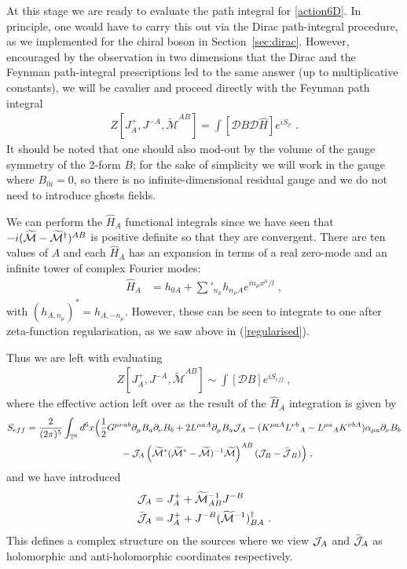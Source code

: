 \documentclass[11pt]{article}
\numberwithin{equation}{section}
\begin{document}
At this stage we are ready to evaluate the path integral for \eqref{action6D}. In principle, one would have to carry this out via the Dirac path-integral procedure, as we implemented for the chiral boson in Section~\ref{sec:dirac}. However, encouraged by the observation in two dimensions that the Dirac and the Feynman path-integral prescriptions led to the same answer (up to multiplicative constants), we will be cavalier and proceed directly with the Feynman path integral
\begin{align}
    Z[J^+_{A},J^{-A}, \widetilde {\mathcal M}^{AB}] = \int[\mathcal DB \mathcal D \hat H ]e^{i S_{\mathcal C}}\;.
\end{align}
It should be noted that one should also mod-out by the volume of the gauge symmetry of the  2-form $B$; for the sake of simplicity we will work in the gauge where $B_{0i}=0$, so there is no infinite-dimensional residual gauge and we do not need to introduce ghosts fields. 

We can perform the $\hat H_A$ functional integrals since we have seen that $-i(\widetilde {\cal M}-\widetilde {\cal M}^\dag)^{AB}$ is positive definite so that they are convergent. There are ten values of $A$ and each $\hat H_A$ has an  expansion in terms of a real zero-mode and an infinite tower of complex Fourier modes: 
\begin{align}
\hat H_A & = h_{0A} +\sum'_{n_{\mu}} h_{n_\mu A}e^{in_{\mu} x^\mu /l}	 \;,
\end{align} 
with $(h_{A,n_\mu})^*=  h_{A,-n_\mu}$. However, these can be seen to integrate to one after zeta-function regularisation, as we saw above in (\ref{regularised}).

Thus we are left with evaluating
\begin{align}\label{wJ}
Z[J^+_{A},J^{-A}, \widetilde {\mathcal M}^{AB}]  \sim \int [\mathcal DB] e^{iS_{eff}}\ ,
\end{align}
where the effective action left over as the result of the $\hat H_A$ integration is given by
\begin{align}
	S_{eff}  &= \frac{2}{(2\pi)^5} \int_{{\mathbb T}^6} d^6x \Big(\frac12 G^{\mu\nu ab}\partial_\mu B_a\partial_\nu B_b +2L^{\mu a A}\partial_\mu B_a{\cal J}_{A}-(K^{\mu a A}L^{\nu b}{}_A-L^{\mu a}{}_AK^{\nu b A})\alpha_{\mu a}\partial_\nu B_b\nonumber \\ &\qquad\qquad\qquad\qquad\qquad-{\cal J}_{A} \left(\widetilde{\cal M}^*(\widetilde{\cal M}^*-\widetilde{\cal M})^{-1}\widetilde{\cal M}\right)^{AB}({\cal J}_B- {\bar {\cal J}}_B)	\Big)\;,    
\end{align}
and  we have introduced
\begin{align}
{\cal J}_{A} &= J^+_{A} + \widetilde{\cal M}^{-1}_{AB}J^{-B}\nonumber\\
\bar {\cal J}_A &=J^+_{A} + J^{-B} (\widetilde {\cal M}^{-1})^\dag_{BA}\ .\end{align}
 This defines a complex structure on the sources where we view ${\cal J}_{A}$ and $\bar {\cal J}_A$ as  holomorphic and anti-holomorphic coordinates respectively.
\end{document}

